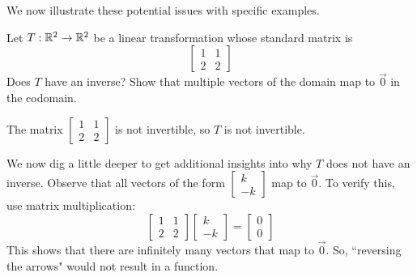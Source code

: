 \documentclass{ximera}
\begin{document}
We now illustrate these potential issues with specific examples.
\begin{example}\label{ex:notonetoone} Let $T:\mathbb{R}^2\rightarrow \mathbb{R}^2$ be a linear transformation whose standard matrix is
$$\begin{bmatrix}1&1\\2&2\end{bmatrix}$$
Does $T$ have an inverse? Show that multiple vectors of the domain map to $\vec{0}$ in the codomain.  

\begin{explanation} The matrix $\begin{bmatrix}1&1\\2&2\end{bmatrix}$ is not invertible, so $T$ is not invertible.

We now dig a little deeper to get additional insights into why $T$ does not have an inverse.  Observe that all vectors of the form $\begin{bmatrix}k\\-k\end{bmatrix}$ map to $\vec{0}$.  To verify this, use matrix multiplication:
$$\begin{bmatrix}1&1\\2&2\end{bmatrix}\begin{bmatrix}k\\-k\end{bmatrix}=\begin{bmatrix}0\\0\end{bmatrix}$$
This shows that there are infinitely many vectors that map to $\vec{0}$.  So, ``reversing the arrows" would not result in a function.


\end{explanation}
\end{example}
\end{document}
